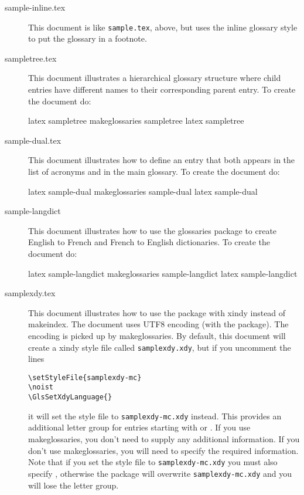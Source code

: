 \documentclass[report]{nlctdoc}
\newcommand*{\glostyle}[1]{\textsf{#1}\index{glossary styles:>#1={\protect\ttfamily#1}|main}}
\begin{document}
\begin{description}
\item[sample-inline.tex]\label{ex:sample-inline} This document is
like \texttt{sample.tex}, above, but uses the \glostyle{inline}
glossary style to put the glossary in a footnote.

\item[sampletree.tex]\label{ex:sampletree} This document illustrates
a hierarchical glossary structure where child entries have different
names to their corresponding parent entry. To create the document
do:
\begin{prompt}
latex sampletree
makeglossaries sampletree
latex sampletree
\end{prompt}

\item[sample-dual.tex]\label{ex:sample-dual} This document
illustrates how to define an entry that both appears in the list of
acronyms and in the main glossary. To create the document do:
\begin{prompt}
latex sample-dual
makeglossaries sample-dual
latex sample-dual
\end{prompt}

\item[sample-langdict]\label{ex:sample-langdict} This document
illustrates how to use the glossaries package to create English
to French and French to English dictionaries. To create the document
do:
\begin{prompt}
latex sample-langdict
makeglossaries sample-langdict
latex sample-langdict
\end{prompt}

\item[samplexdy.tex]\label{ex:samplexdy} This document illustrates
how to use the  package with \gls{xindy} instead
of \gls{makeindex}. The document uses UTF8 encoding (with the
 package). The encoding is picked up by
\gls{makeglossaries}. By default, this document will create a
\gls{xindy} style file called \texttt{samplexdy.xdy}, but if you
uncomment the lines
\begin{verbatim}
\setStyleFile{samplexdy-mc}
\noist
\GlsSetXdyLanguage{}
\end{verbatim}
it will set the style file to \texttt{samplexdy-mc.xdy} instead.
This provides an additional letter group for entries starting with
 or . If you use \gls{makeglossaries}, you don't
need to supply any additional information. If you don't use
\gls*{makeglossaries}, you will need to specify the required
information. Note that if you set the style file to
\texttt{samplexdy-mc.xdy} you must also specify ,
otherwise the  package will overwrite
\texttt{samplexdy-mc.xdy} and you will lose the  letter
group.


\end{description}
\end{document}

